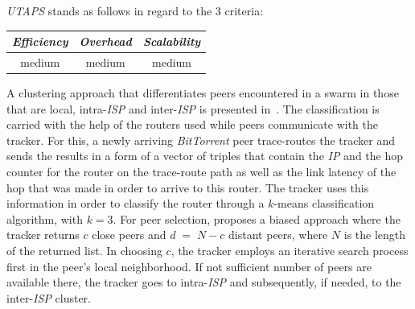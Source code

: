 \emph{UTAPS} stands as follows in regard to the $3$ criteria:
\begin{center}
{\footnotesize
\begin{tabular}{ccc}
\emph{Efficiency} & \emph{Overhead} & \emph{Scalability} \\
\hline
medium &
medium &
%
medium
\end{tabular}
}
\end{center}

A clustering approach that differentiates peers encountered in a swarm
in those that are local, intra-\emph{ISP} and inter-\emph{ISP} is 
presented in~\cite{QLZG2009}.
The classification is carried with the help of the routers used 
while peers communicate with the tracker.
For this, a newly arriving
{\sl BitTorrent} peer trace-routes the tracker and 
sends the results in a form of a
vector of triples that contain the \emph{IP} 
and the hop counter for the router on the
trace-route path as well as the link latency 
of the hop that was made in order to arrive to this router. 
The tracker uses this information in order to classify
the router through a $k$-means classification algorithm, with $k = 3$. 
For peer selection, \cite{QLZG2009} proposes a biased approach 
where the tracker returns $c$ close peers 
and $d\;=\;N-c$ distant peers, where $N$ is the length of the returned list. 
In choosing $c$, the tracker employs an iterative search process
first in the peer's local neighborhood. If not sufficient number of 
peers are available there, the tracker goes to intra-\emph{ISP} 
and subsequently, if needed, to the inter-\emph{ISP} cluster. 
